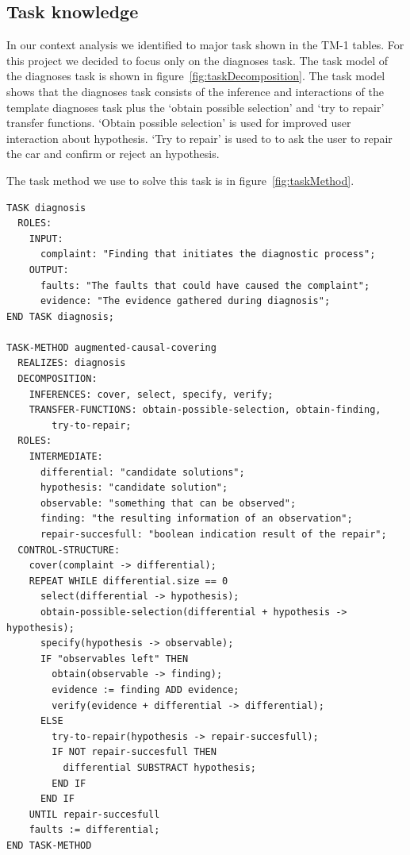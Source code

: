 \subsection{Task knowledge}
In our context analysis we identified to major task shown in the TM-1 tables.
For this project we decided to focus only on the diagnoses task. The task model
of the diagnoses task is shown in figure~\ref{fig:taskDecomposition}. The task
model shows that the diagnoses task consists of the inference and
interactions of the template diagnoses task plus the `obtain possible selection'
and `try to repair' transfer functions. `Obtain possible selection' is used for 
improved user interaction about hypothesis.
`Try to repair' is used to to ask the user to repair the car and confirm or
reject an hypothesis.

The task method we use to solve this task is in figure~\ref{fig:taskMethod}.
\begin{verbatim}
TASK diagnosis
  ROLES:
    INPUT:
      complaint: "Finding that initiates the diagnostic process";
    OUTPUT:
      faults: "The faults that could have caused the complaint";
      evidence: "The evidence gathered during diagnosis";
END TASK diagnosis;

TASK-METHOD augmented-causal-covering
  REALIZES: diagnosis
  DECOMPOSITION:
    INFERENCES: cover, select, specify, verify;
    TRANSFER-FUNCTIONS: obtain-possible-selection, obtain-finding,
        try-to-repair;
  ROLES:
    INTERMEDIATE:
      differential: "candidate solutions";
      hypothesis: "candidate solution";
      observable: "something that can be observed";
      finding: "the resulting information of an observation";
      repair-succesfull: "boolean indication result of the repair";
  CONTROL-STRUCTURE:
    cover(complaint -> differential);
    REPEAT WHILE differential.size == 0
      select(differential -> hypothesis);
      obtain-possible-selection(differential + hypothesis -> hypothesis);
      specify(hypothesis -> observable);
      IF "observables left" THEN
        obtain(observable -> finding);
        evidence := finding ADD evidence;
        verify(evidence + differential -> differential);
      ELSE
        try-to-repair(hypothesis -> repair-succesfull);
        IF NOT repair-succesfull THEN
          differential SUBSTRACT hypothesis;
        END IF
      END IF
    UNTIL repair-succesfull
    faults := differential;
END TASK-METHOD

\end{verbatim}
